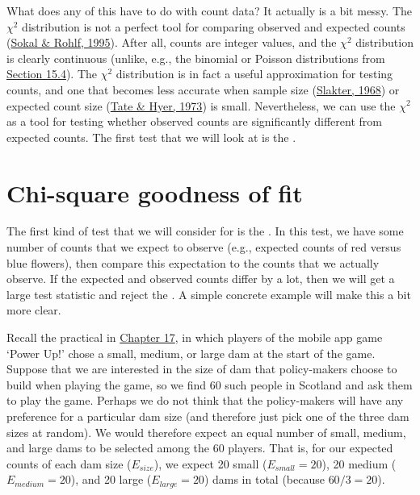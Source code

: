 \documentclass[
  openany]{krantz}
\begin{document}
What does any of this have to do with count data? It actually is a bit messy.
The \(\chi^{2}\) distribution is not a perfect tool for comparing observed and expected counts (\protect\hyperlink{ref-Sokal1995}{Sokal \& Rohlf, 1995}).
After all, counts are integer values, and the \(\chi^{2}\) distribution is clearly continuous (unlike, e.g., the binomial or Poisson distributions from \protect\hyperlink{ux5cux23probability-distributions}{Section 15.4}).
The \(\chi^{2}\) distribution is in fact a useful approximation for testing counts, and one that becomes less accurate when sample size (\protect\hyperlink{ref-Slakter1968}{Slakter, 1968}) or expected count size (\protect\hyperlink{ref-Tate1973}{Tate \& Hyer, 1973}) is small.
Nevertheless, we can use the \(\chi^{2}\)  as a tool for testing whether observed counts are significantly different from expected counts.
The first test that we will look at is the .

\hypertarget{chi-square-goodness-of-fit}{%
\section{Chi-square goodness of fit}\label{chi-square-goodness-of-fit}}

The first kind of test that we will consider for  is the .
In this test, we have some number of counts that we expect to observe (e.g., expected counts of red versus blue flowers), then compare this expectation to the counts that we actually observe.
If the expected and observed counts differ by a lot, then we will get a large test statistic and reject the .
A simple concrete example will make this a bit more clear.

Recall the practical in \protect\hyperlink{Chapter_17}{Chapter 17}, in which players of the mobile app game `Power Up!' chose a small, medium, or large dam at the start of the game.
Suppose that we are interested in the size of dam that policy-makers choose to build when playing the game, so we find 60 such people in Scotland and ask them to play the game.
Perhaps we do not think that the policy-makers will have any preference for a particular dam size (and therefore just pick one of the three dam sizes at random).
We would therefore expect an equal number of small, medium, and large dams to be selected among the 60 players.
That is, for our expected counts of each dam size (\(E_{size}\)), we expect 20 small (\(E_{small} = 20\)), 20 medium (\(E_{medium} = 20\)), and 20 large (\(E_{large} = 20\)) dams in total (because \(60/3 = 20\)).
\end{document}
